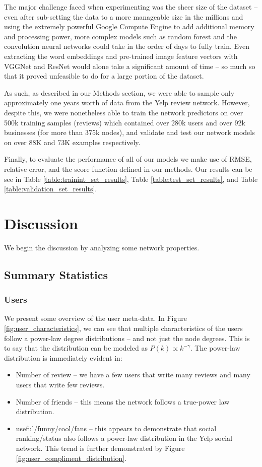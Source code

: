 \documentclass[letterpaper, 10 pt, conference]{ieeeconf}  %
\begin{document}
The major challenge faced when experimenting was the sheer size of the dataset -- even after sub-setting the data to a more manageable size in the millions and using the extremely powerful Google Compute Engine to add additional memory and processing power, more complex models such as random forest and the convolution neural networks could take in the order of days to fully train. Even extracting the word embeddings and pre-trained image feature vectors with VGGNet and ResNet would alone take a significant amount of time -- so much so that it proved unfeasible to do for a large portion of the dataset.

As such, as described in our Methods section, we were able to sample only approximately one years worth of data from the Yelp review network. However, despite this, we were nonetheless able to train the network predictors on over 500k training samples (reviews) which contained over 280k users and over 92k businesses (for more than 375k nodes), and validate and test our network models on over 88K and 73K examples respectively.

Finally, to evaluate the performance of all of our models we make use of RMSE, relative error, and the score function defined in our methods. Our results can be see in Table \ref{table:trainint_set_results}, Table \ref{table:test_set_results}, and Table \ref{table:validation_set_results}.

\section{Discussion}
We begin the discussion by analyzing some network properties.

\subsection{Summary Statistics}
\subsubsection{Users}
We present some overview of the user meta-data. In Figure \ref{fig:user_characteristics}, we can see that multiple characteristics of the users follow a power-law degree distributions -- and not just the node degrees. This is to say that the distribution can be modeled as $P(k) \propto k^{-\gamma}$. The power-law distribution is immediately evident in:

\begin{itemize}
\item Number of review -- we have a few users that write many reviews and many users that write few reviews.
\item Number of friends -- this means the network follows a true-power law distribution.
\item useful/funny/cool/fans -- this appears to demonstrate that social ranking/status also follows a power-law distribution in the Yelp social network. This trend is further demonstrated by Figure \ref{fig:user_compliment_distribution}.
\end{itemize} 
\end{document}
